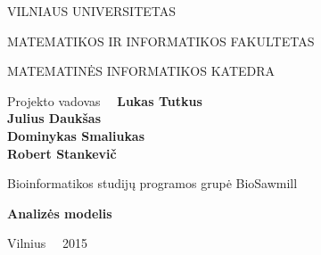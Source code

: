 \documentclass[a4paper,12pt]{article}
\begin{document}
\graphicspath{ {/} }

\renewcommand{\cftdot}{.}	
\renewcommand{\cftsecleader}{\cftdotfill{\cftdotsep}}

\thispagestyle{empty} %


\begin{center}
 VILNIAUS UNIVERSITETAS 
 
MATEMATIKOS IR INFORMATIKOS FAKULTETAS

MATEMATINĖS INFORMATIKOS KATEDRA

\vspace{4cm}

Projekto vadovas \ \ \textbf{Lukas Tutkus} \\
\textbf{Julius Daukšas} \\
\textbf{Dominykas Smaliukas} \\
\textbf{Robert Stankevič} \\

\vspace{0.2cm}

Bioinformatikos studijų programos grupė BioSawmill



\vspace{3cm}
\textbf{\Large Analizės modelis}\\


\vfill

Vilnius \ \  2015
\end{center}



\clearpage

\tableofcontents
\clearpage
\end{document}
